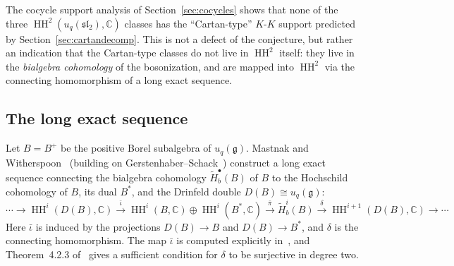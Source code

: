 \documentclass[11pt,letterpaper]{amsart}
\theoremstyle{plain}
\theoremstyle{definition}
\theoremstyle{remark}
\newcommand{\HH}{\operatorname{HH}}
\newcommand{\CC}{\mathbb{C}}
\begin{document}
The cocycle support analysis of Section~\ref{sec:cocycles} shows that none of the three $\HH^2(u_q(\mathfrak{sl}_2), \CC)$ classes has the ``Cartan-type'' $K$-$K$ support predicted by Section~\ref{sec:cartandecomp}. This is not a defect of the conjecture, but rather an indication that the Cartan-type classes do not live in $\HH^2$ itself: they live in the \emph{bialgebra cohomology} of the bosonization, and are mapped into $\HH^2$ via the connecting homomorphism of a long exact sequence.

\subsection{The long exact sequence}

Let $B = B^+$ be the positive Borel subalgebra of $u_q(\mathfrak{g})$. Mastnak and Witherspoon~\cite{MW08} (building on Gerstenhaber--Schack~\cite{GS90}) construct a long exact sequence connecting the bialgebra cohomology $\tilde{H}^\bullet_b(B)$ of $B$ to the Hochschild cohomology of $B$, its dual $B^*$, and the Drinfeld double $D(B) \cong u_q(\mathfrak{g})$:
\begin{equation}
\label{eq:mwles}
\cdots \to \HH^i(D(B), \CC) \xrightarrow{\bar\iota} \HH^i(B, \CC) \oplus \HH^i(B^*, \CC) \xrightarrow{\bar\pi} \tilde{H}^i_b(B) \xrightarrow{\delta} \HH^{i+1}(D(B), \CC) \to \cdots
\end{equation}
Here $\bar\iota$ is induced by the projections $D(B) \to B$ and $D(B) \to B^*$, and $\delta$ is the connecting homomorphism. The map $\bar\iota$ is computed explicitly in~\cite[\S 3.4]{MW08}, and Theorem~4.2.3 of~\cite{MW08} gives a sufficient condition for $\delta$ to be surjective in degree two.
\end{document}
